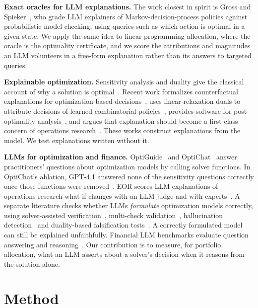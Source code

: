 \textbf{Exact oracles for LLM explanations.} The work closest in spirit is Gross
and Spieker~\cite{gross26}, who grade LLM explainers of Markov-decision-process
policies against probabilistic model checking, using queries such as which
action is optimal in a given state. We apply the same idea to
linear-programming allocation, where the oracle is the optimality certificate,
and we score the attributions and magnitudes an LLM volunteers in a free-form
explanation rather than its answers to targeted queries.

\textbf{Explainable optimization.} Sensitivity analysis and duality give the
classical account of why a solution is optimal~\cite{bertsimas97}. Recent work
formalizes counterfactual explanations for optimization-based
decisions~\cite{korikov21,cflp25}, uses linear-relaxation duals to attribute
decisions of learned combinatorial policies~\cite{cea26}, provides software for
post-optimality analysis~\cite{pyoptexplain26}, and argues that explanation
should become a first-class concern of operations research~\cite{explopt26}.
These works construct explanations from the model. We test explanations written
without it.

\textbf{LLMs for optimization and finance.} OptiGuide~\cite{optiguide23} and
OptiChat~\cite{optichat25} answer practitioners' questions about optimization
models by calling solver functions. In OptiChat's ablation, GPT-4.1 answered
none of the sensitivity questions correctly once those functions were
removed~\cite{optichat25}. EOR scores LLM explanations of operations-research
what-if changes with an LLM judge and with experts~\cite{eor25}. A separate
literature checks whether LLMs \emph{formulate} optimization models correctly,
using solver-assisted verification~\cite{verisimpl26}, multi-check
validation~\cite{trival26}, hallucination detection~\cite{optargus26} and
duality-based falsification tests~\cite{falsify26}. A correctly formulated model
can still be explained unfaithfully. Financial LLM benchmarks evaluate question
answering and reasoning~\cite{fintrade26}. Our contribution is to measure, for
portfolio allocation, what an LLM asserts about a solver's decision when it
reasons from the solution alone.

\section{Method}
\label{sec:method}
